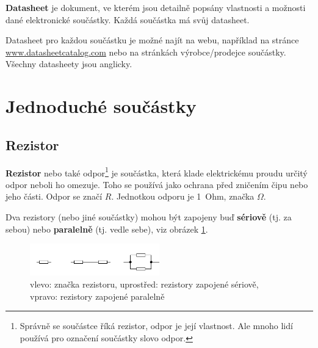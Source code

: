 
\label{elektronika}


{\bf Datasheet}  je dokument, ve kterém jsou detailně popsány vlastnosti a možnosti dané elektronické součástky.
Každá součástka má svůj datasheet. 

Datasheet pro každou součástku je možné najít na webu, například na stránce \url{www.datasheetcatalog.com}
nebo na stránkách výrobce/prodejce součástky. 
Všechny datasheety jsou anglicky.  


\section{Jednoduché součástky} 


\subsection{Rezistor} \label{rezistor}

{\bf Rezistor}   nebo také odpor\footnote{Správně se součástce říká rezistor, odpor je její vlastnost.
	 Ale mnoho lidí používá pro označení součástky slovo odpor.} je součástka, která klade elektrickému proudu  určitý odpor neboli ho omezuje. 
	Toho se používá jako ochrana před zničením čipu nebo jeho části. Odpor se značí $R$. Jednotkou odporu je 1~Ohm, značka $\Omega$. 

 Dva rezistory (nebo jiné součástky) mohou být zapojeny buď 
 {\bf sériově}  \label{seriove}
 (tj. za sebou) nebo {\bf paralelně} (tj. vedle sebe), viz obrázek \ref{fig:rezistory}. 

\begin{figure}[h]
	\begin{center}
	\includegraphics[width=0.5\textwidth]{soubory/rezistory.jpg}		
	\end{center}
	\caption{ vlevo: značka rezistoru, uprostřed: rezistory zapojené sériově, vpravo: rezistory zapojené paralelně} 
	\label{fig:rezistory}
\end{figure}


